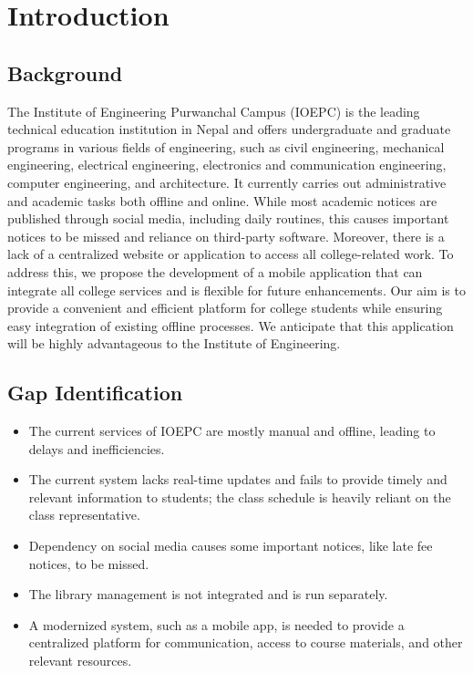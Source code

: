 \chapter{Introduction}

\section{Background}
The Institute of Engineering Purwanchal Campus (IOEPC) is the leading technical education institution in Nepal and offers undergraduate and graduate programs in various fields of engineering, such as civil engineering, mechanical engineering, electrical engineering, electronics and communication engineering, computer engineering, and architecture. It currently carries out administrative and academic tasks both offline and online. While most academic notices are published through social media, including daily routines, this causes important notices to be missed and reliance on third-party software. Moreover, there is a lack of a centralized website or application to access all college-related work. To address this, we propose the development of a mobile application that can integrate all college services and is flexible for future enhancements. Our aim is to provide a convenient and efficient platform for college students while ensuring easy integration of existing offline processes. We anticipate that this application will be highly advantageous to the Institute of Engineering.

\section{Gap Identification}
\begin{itemize}
    \item The current services of IOEPC are mostly manual and offline, leading to delays and inefficiencies.
    \item The current system lacks real-time updates and fails to provide timely and relevant information to students; the class schedule is heavily reliant on the class representative.
    \item Dependency on social media causes some important notices, like late fee notices, to be missed.
    \item The library management is not integrated and is run separately.
    \item A modernized system, such as a mobile app, is needed to provide a centralized platform for communication, access to course materials, and other relevant resources.
\end{itemize}

